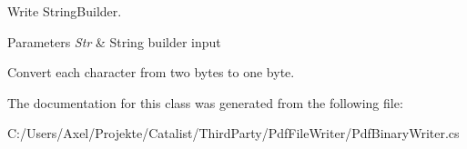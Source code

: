 Write String\+Builder. 


\begin{DoxyParams}{Parameters}
{\em Str} & String builder input\\
\hline
\end{DoxyParams}


Convert each character from two bytes to one byte. 

The documentation for this class was generated from the following file\+:\begin{DoxyCompactItemize}
\item 
C\+:/\+Users/\+Axel/\+Projekte/\+Catalist/\+Third\+Party/\+Pdf\+File\+Writer/Pdf\+Binary\+Writer.\+cs\end{DoxyCompactItemize}
